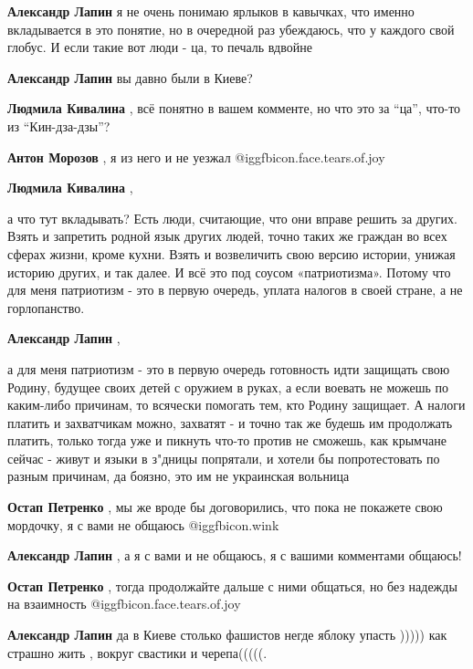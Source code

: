 \begin{itemize}
\begin{itemize}
\textbf{Александр Лапин} я не очень понимаю ярлыков в кавычках, что именно вкладывается в это понятие, но в очередной раз убеждаюсь, что у каждого свой глобус.
И если такие вот люди - ца, то печаль вдвойне

\textbf{Александр Лапин} вы давно были в Киеве?

\textbf{Людмила Кивалина} , всё понятно в вашем комменте, но что это за \enquote{ца}, что-то из \enquote{Кин-дза-дзы}?

\textbf{Антон Морозов} , я из него и не уезжал  @igg{fbicon.face.tears.of.joy} 

\textbf{Людмила Кивалина} , 

а что тут вкладывать? Есть люди, считающие, что они вправе решить за других.
Взять и запретить родной язык других людей, точно таких же граждан во всех
сферах жизни, кроме кухни. Взять и возвеличить свою версию истории, унижая
историю других, и так далее. И всё это под соусом «патриотизма». Потому что для
меня патриотизм - это в первую очередь, уплата налогов в своей стране, а не
горлопанство.


\textbf{Александр Лапин} , 

а для меня патриотизм - это в первую очередь готовность идти защищать свою
Родину, будущее своих детей с оружием в руках, а если воевать не можешь по
каким-либо причинам, то всячески помогать тем, кто Родину защищает. А налоги
платить и захватчикам можно, захватят - и точно так же будешь им продолжать
платить, только тогда уже и пикнуть что-то против не сможешь, как крымчане
сейчас - живут и языки в з"дницы попрятали, и хотели бы попротестовать по
разным причинам, да боязно, это им не украинская вольница

\textbf{Остап Петренко} , мы же вроде бы договорились, что пока не покажете свою мордочку, я с вами не общаюсь  @igg{fbicon.wink} 

\textbf{Александр Лапин} , а я с вами и не общаюсь, я с вашими комментами общаюсь!

\textbf{Остап Петренко} , тогда продолжайте дальше с ними общаться, но без надежды на взаимность  @igg{fbicon.face.tears.of.joy} 

\textbf{Александр Лапин} да в Киеве столько фашистов негде яблоку упасть ))))) как страшно жить , вокруг свастики и черепа(((((.


\end{itemize}
\end{itemize}
